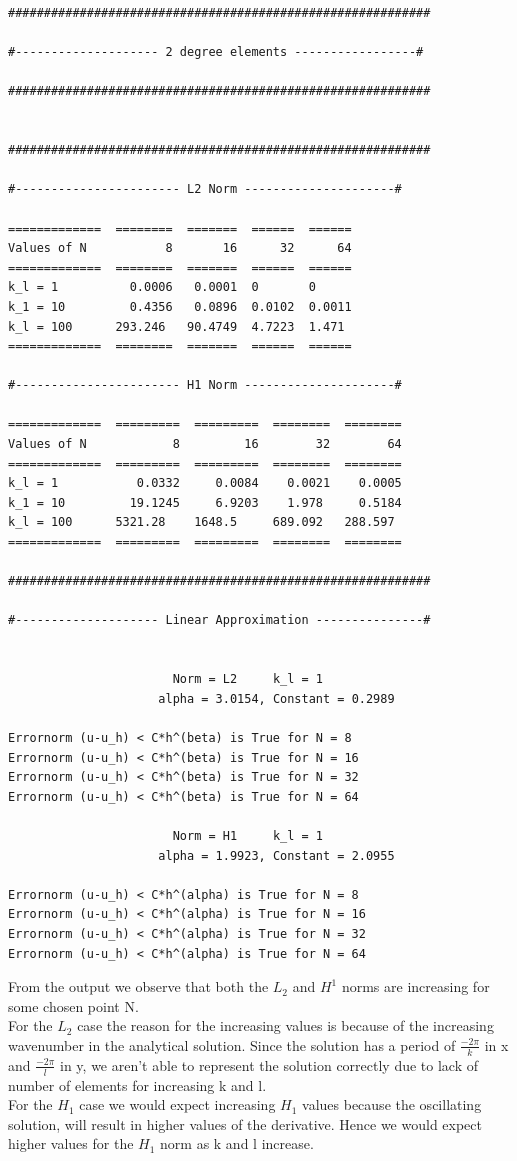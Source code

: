 \documentclass[a4paper,norsk]{article}
\begin{document}
\newpage
\begin{lstlisting}[style=terminal]
###########################################################

#-------------------- 2 degree elements -----------------#

###########################################################


###########################################################

#----------------------- L2 Norm ---------------------#

=============  ========  =======  ======  ======
Values of N           8       16      32      64
=============  ========  =======  ======  ======
k_l = 1          0.0006   0.0001  0       0
k_1 = 10         0.4356   0.0896  0.0102  0.0011
k_l = 100      293.246   90.4749  4.7223  1.471
=============  ========  =======  ======  ======

#----------------------- H1 Norm ---------------------#

=============  =========  =========  ========  ========
Values of N            8         16        32        64
=============  =========  =========  ========  ========
k_l = 1           0.0332     0.0084    0.0021    0.0005
k_1 = 10         19.1245     6.9203    1.978     0.5184
k_l = 100      5321.28    1648.5     689.092   288.597
=============  =========  =========  ========  ========

###########################################################

#-------------------- Linear Approximation ---------------#


                       Norm = L2     k_l = 1
                     alpha = 3.0154, Constant = 0.2989

Errornorm (u-u_h) < C*h^(beta) is True for N = 8
Errornorm (u-u_h) < C*h^(beta) is True for N = 16
Errornorm (u-u_h) < C*h^(beta) is True for N = 32
Errornorm (u-u_h) < C*h^(beta) is True for N = 64

                       Norm = H1     k_l = 1
                     alpha = 1.9923, Constant = 2.0955

Errornorm (u-u_h) < C*h^(alpha) is True for N = 8
Errornorm (u-u_h) < C*h^(alpha) is True for N = 16
Errornorm (u-u_h) < C*h^(alpha) is True for N = 32
Errornorm (u-u_h) < C*h^(alpha) is True for N = 64

\end{lstlisting}
\newpage

From the output we observe that both the $L_2$ and $H^1$ norms are increasing
for some chosen point N.\\
For the $L_2$ case the reason for the increasing values is because of the increasing
wavenumber in the analytical solution.  Since the solution has a period of $ \frac{-2 \pi}{k} $ in x
and $\frac{-2\pi}{l}$ in y, we aren't able to represent the solution correctly due to lack of number of elements
for increasing k and l. \\
For the $H_1$ case we would expect increasing $H_1$ values because the oscillating solution, will
result in higher values of the derivative. Hence we would expect higher values for the $H_1$ norm as k and l increase.
\end{document}
